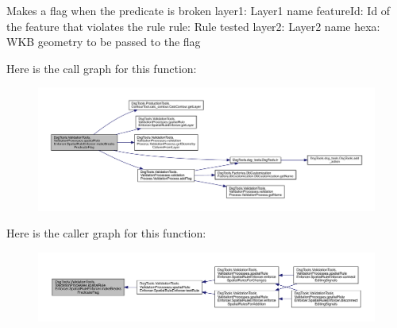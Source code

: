 \begin{DoxyVerb}Makes a flag when the predicate is broken
layer1: Layer1 name
featureId: Id of the feature that violates the rule
rule: Rule tested
layer2: Layer2 name
hexa: WKB geometry to be passed to the flag
\end{DoxyVerb}
 Here is the call graph for this function\+:
\nopagebreak
\begin{figure}[H]
\begin{center}
\leavevmode
\includegraphics[width=350pt]{class_dsg_tools_1_1_validation_tools_1_1_validation_processes_1_1spatial_rule_enforcer_1_1_spatial_rule_enforcer_af5826fc69a3252c80d07579c23c14c32_cgraph}
\end{center}
\end{figure}
Here is the caller graph for this function\+:
\nopagebreak
\begin{figure}[H]
\begin{center}
\leavevmode
\includegraphics[width=350pt]{class_dsg_tools_1_1_validation_tools_1_1_validation_processes_1_1spatial_rule_enforcer_1_1_spatial_rule_enforcer_af5826fc69a3252c80d07579c23c14c32_icgraph}
\end{center}
\end{figure}
\mbox{\label{class_dsg_tools_1_1_validation_tools_1_1_validation_processes_1_1spatial_rule_enforcer_1_1_spatial_rule_enforcer_a22b1704cb8ae1140b03a0f0377f180d4}} 
